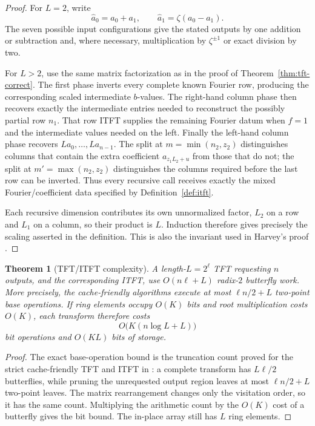 \documentclass[11pt]{book}
\newtheorem{theorem}{Theorem}[section]
\theoremstyle{definition}
\begin{document}
\begin{proof}
For $L=2$, write
\[
 \widehat a_0=a_0+a_1,\qquad
 \widehat a_1=\zeta(a_0-a_1).
\]
The seven possible input configurations give the stated outputs by one addition
or subtraction and, where necessary, multiplication by $\zeta^{\pm1}$ or
exact division by two.

For $L>2$, use the same matrix factorization as in the proof of
Theorem~\ref{thm:tft-correct}.  The first phase inverts every complete known
Fourier row, producing the corresponding scaled intermediate $b$-values.
The right-hand column phase then recovers exactly the intermediate entries
needed to reconstruct the possibly partial row $n_1$.  That row ITFT supplies
the remaining Fourier datum when $f=1$ and the intermediate values needed on
the left.  Finally the left-hand column phase recovers
$La_0,\ldots,La_{n-1}$.  The split at $m=\min(n_2,z_2)$ distinguishes columns
that contain the extra coefficient $a_{z_1L_2+u}$ from those that do not; the
split at $m'=\max(n_2,z_2)$ distinguishes the columns required before the last
row can be inverted.  Thus every recursive call receives exactly the mixed
Fourier/coefficient data specified by Definition~\ref{def:itft}.

Each recursive dimension contributes its own unnormalized factor, $L_2$ on a
row and $L_1$ on a column, so their product is $L$.  Induction therefore gives
precisely the scaling asserted in the definition.  This is also the invariant
used in Harvey's proof \cite{Harvey2008CacheTFT}.
\end{proof}

\begin{theorem}[TFT/ITFT complexity]\label{thm:tft-complexity}
A length-$L=2^\ell$ TFT requesting $n$ outputs, and the corresponding ITFT,
use $O(n\ell+L)$ radix-$2$ butterfly work.  More precisely, the cache-friendly
algorithms execute at most $\ell n/2+L$ two-point base operations.  If ring
elements occupy $O(K)$ bits and root multiplication costs $O(K)$, each
transform therefore costs
\[
 O\bigl(K(n\log L+L)\bigr)
\]
bit operations and $O(KL)$ bits of storage.
\end{theorem}

\begin{proof}
The exact base-operation bound is the truncation count proved for the strict
cache-friendly TFT and ITFT in \cite{Harvey2008CacheTFT}: a complete transform
has $L\ell/2$ butterflies, while pruning the unrequested output region leaves
at most $\ell n/2+L$ two-point leaves.  The matrix rearrangement changes only
the visitation order, so it has the same count.  Multiplying the arithmetic
count by the $O(K)$ cost of a butterfly gives the bit bound.  The in-place
array still has $L$ ring elements.
\end{proof}
\end{document}
